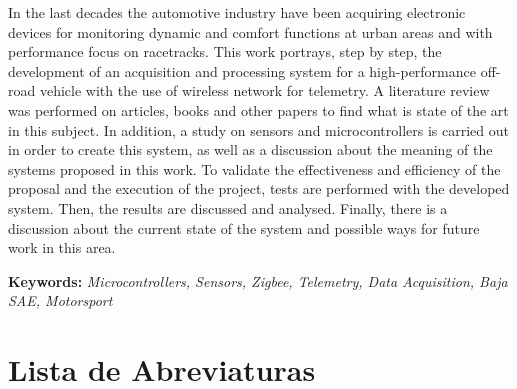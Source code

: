 \noindent In the last decades the automotive industry have been acquiring electronic devices for monitoring dynamic and comfort functions at urban areas and with performance focus on racetracks. This work portrays, step by step, the development of an acquisition and processing system for a high-performance off-road vehicle with the use of wireless network for telemetry. A literature review was performed on articles, books and other papers to find what is state of the art in this subject. In addition, a study on sensors and microcontrollers is carried out in order to create this system, as well as a discussion about the meaning of the systems proposed in this work. To validate the effectiveness and efficiency of the proposal and the execution of the project, tests are performed with the developed system. Then, the results are discussed and analysed. Finally, there is a discussion about the current state of the system and possible ways for future work in this area.        



\noindent \textbf{Keywords:} \textit{Microcontrollers, Sensors, Zigbee, Telemetry, Data Acquisition, Baja SAE, Motorsport} 


\tableofcontents
\listoffigures
\listoftables
\newpage
\chapter*{Lista de Abreviaturas\hfill} 
\listofsymbols

\newpage
\pagestyle{myheadings}
